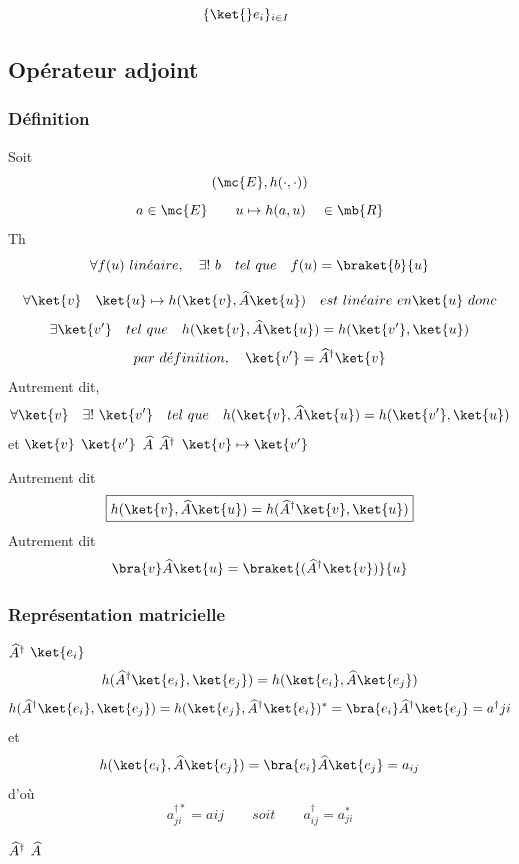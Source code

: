 \[
\{\ket{}e_i\}_{i\in I}\qquad
\]

\subsection{Opérateur adjoint} %
\subsubsection{Définition} %
Soit 
\[
(\mc{E},h(\cdot,\cdot))
\]
\[
a\in\mc{E}\qquad u\mapsto h(a,u)\quad\in\mb{R} 
\]
Th
\[
\forall f(u) \ lin\acute eaire,\quad\exists!\ b\quad tel\ que\quad
f(u)=\braket{b}{u}
\]

\[
\forall\ket{v}\quad\ket{u}\mapsto h(\ket{v},\wA\ket{u})\quad
est\ lin\acute eaire\ en \ket{u}\ donc
\]
\[
\exists\ket{v'}\quad tel\ que\quad h(\ket{v},\wA\ket{u})=h(\ket{v'},\ket{u})
\]
\[
par\ d\acute efinition,\quad \ket{v'}=\wA^\dagger\ket{v}
\]
Autrement dit,
\[
\forall\ket{v}\quad\exists!\ \ket{v'}\quad tel\ que\quad h(\ket{v},\wA\ket{u})=
h(\ket{v'},\ket{u})
\]
et $\ket{v}$ $\ket{v'}$ $\widehat A$ $\widehat A^\dagger$ $\ket{v}\mapsto\ket{v'}$

Autrement dit
\[
\boxed{h(\ket{v},\wA\ket{u})=h(\wA^\dagger\ket{v},\ket{u})}
\]
Autrement dit
\[
\bra{v}\wA\ket{u}=\braket{(\wA^\dagger\ket{v})}{u}
\]

\subsubsection{Représentation matricielle} %
$\widehat A^\dagger$ $\ket{e_i}$
\[
h(\wA^\dagger\ket{e_i},\ket{e_j})=h(\ket{e_i},\wA\ket{e_j})
\]
{\footnotesize
\[
h(\wA^\dagger\ket{e_i},\ket{e_j})=h(\ket{e_j},\wA^\dagger\ket{e_i})^*
=\bra{e_i}\wA^\dagger\ket{e_j}=a^\dagger{ji}
\]
et
\[
h(\ket{e_i},\wA\ket{e_j})=\bra{e_i}\wA\ket{e_j}=a_{ij}
\]
}
d'où
\[
a_{ji}^{\dagger *}=a{ij}\qquad soit\qquad\boxed{a_{ij}^\dagger = a_{ji}^*}
\]

$\widehat A^\dagger$ $\widehat A$

